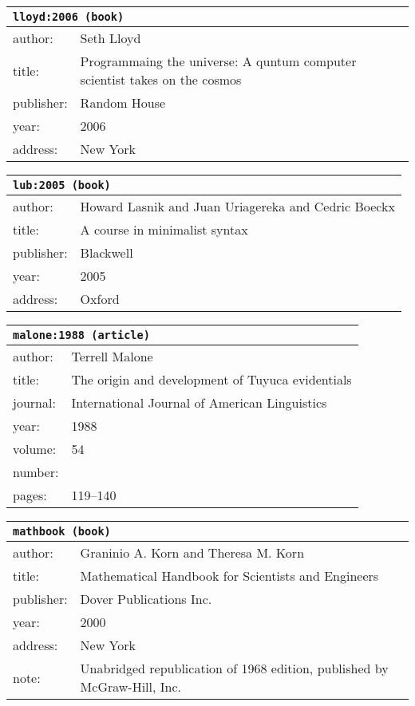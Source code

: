 \documentclass{article}
\begin{document}
\bigskip

\begin{tabular}{p{}p{}}
\multicolumn{2}{l}{\texttt{lloyd:2006 (book)}}\\
\hline
author: & Seth Lloyd\\
title: & Programmaing the universe: A quntum computer scientist takes on the cosmos\\
publisher: & Random House\\
year: & 2006\\
address: & New York\\
\end{tabular}

\bigskip

\begin{tabular}{p{}p{}}
\multicolumn{2}{l}{\texttt{lub:2005 (book)}}\\
\hline
author: & Howard Lasnik and Juan Uriagereka and Cedric Boeckx\\
title: & A course in minimalist syntax\\
publisher: & Blackwell\\
year: & 2005\\
address: & Oxford\\
\end{tabular}

\bigskip

\begin{tabular}{p{}p{}}
\multicolumn{2}{l}{\texttt{malone:1988 (article)}}\\
\hline
author: & Terrell Malone\\
title: & The origin and development of Tuyuca evidentials\\
journal: & International Journal of American Linguistics\\
year: & 1988\\
volume: & 54\\
number: & \\
pages: & 119--140\\
\end{tabular}

\bigskip

\begin{tabular}{p{}p{}}
\multicolumn{2}{l}{\texttt{mathbook (book)}}\\
\hline
author: & Graninio A. Korn and Theresa M. Korn\\
title: & Mathematical Handbook for Scientists and Engineers\\
publisher: & Dover Publications Inc.\\
year: & 2000\\
address: & New York\\
note: & Unabridged republication of 1968 edition, published by McGraw-Hill, Inc.\\
\end{tabular}
\end{document}
